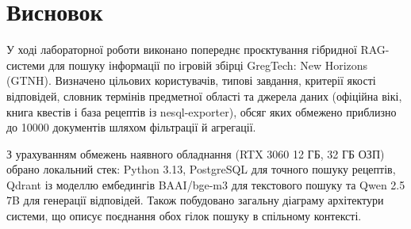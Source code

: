 \clearpage
{}
\chapter*{Висновок}
\label{chapter:conclusion}

У ході лабораторної роботи виконано попереднє проєктування гібридної RAG-системи для пошуку інформації по ігровій збірці GregTech: New Horizons (GTNH). Визначено цільових користувачів, типові завдання, критерії якості відповідей, словник термінів предметної області та джерела даних (офіційна вікі, книга квестів і база рецептів із nesql-exporter), обсяг яких обмежено приблизно до 10000 документів шляхом фільтрації й агрегації.

З урахуванням обмежень наявного обладнання (RTX 3060 12 ГБ, 32 ГБ ОЗП) обрано локальний стек: Python 3.13, PostgreSQL для точного пошуку рецептів, Qdrant із моделлю ембедингів BAAI/bge-m3 для текстового пошуку та Qwen 2.5 7B для генерації відповідей. Також побудовано загальну діаграму архітектури системи, що описує поєднання обох гілок пошуку в спільному контексті.